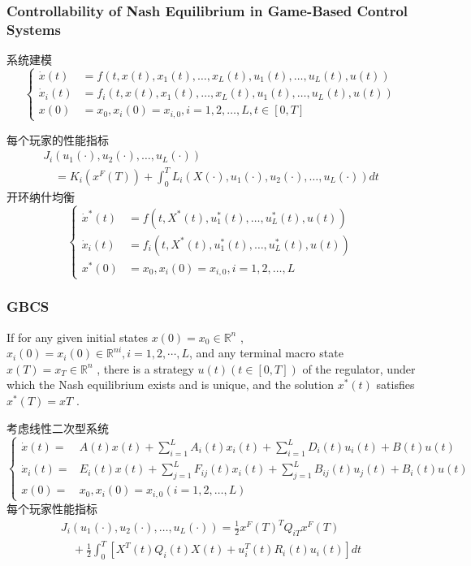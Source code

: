 \documentclass[UTF8, aspectratio=169, 9pt]{ctexbeamer}
\begin{document}
\begin{frame}
\frametitle{Controllability of Nash Equilibrium in Game-Based Control Systems}
系统建模
$$
\left\{\begin{aligned}
\dot{x}(t) &=f\left(t, x(t), x_{1}(t), \ldots, x_{L}(t), u_{1}(t), \ldots, u_{L}(t), u(t)\right) \\
\dot{x}_{i}(t) &=f_{i}\left(t, x(t), x_{1}(t), \ldots, x_{L}(t), u_{1}(t), \ldots, u_{L}(t), u(t)\right) \\
x(0) &=x_{0}, x_{i}(0)=x_{i, 0}, i=1,2, \ldots, L, t \in[0, T]
\end{aligned}\right.
$$

每个玩家的性能指标
$$
\begin{array}{l}
J_{i}\left(u_{1}(\cdot), u_{2}(\cdot), \ldots, u_{L}(\cdot)\right) \\
\quad=K_{i}\left(x^{F}(T)\right)+\int_{0}^{T} L_{i}\left(X(\cdot), u_{1}(\cdot), u_{2}(\cdot), \ldots, u_{L}(\cdot)\right) d t
\end{array}
$$
开环纳什均衡
$$
\left\{\begin{aligned}
\dot{x}^{*}(t) &=f\left(t, X^{*}(t), u_{1}^{*}(t), \ldots, u_{L}^{*}(t), u(t)\right) \\
\dot{x}_{i}(t) &=f_{i}\left(t, X^{*}(t), u_{1}^{*}(t), \ldots, u_{L}^{*}(t), u(t)\right) \\
x^{*}(0) &=x_{0}, x_{i}(0)=x_{i, 0}, i=1,2, \ldots, L
\end{aligned}\right.
$$
\end{frame}

\begin{frame}
\frametitle{GBCS}
\begin{definition}[可控性]
If for any given
initial states $x(0) = x_0 \in  \mathbb{R}^n$ , $x_i (0) = x_i(0) \in  \mathbb{R}^{n i} , i = 1, 2, \cdots , L$,
and any terminal macro state $x(T) = x_T \in  \mathbb{R}^n$ , there is a strategy
$u(t)(t \in [0, T ])$ of the regulator, under which the Nash equilibrium
exists and is unique, and the solution $x^* (t)$ satisfies $x^*(T )
= xT$ .
\end{definition}
考虑线性二次型系统
$$
\left\{\begin{aligned}
\dot{x}(t)=& A(t) x(t)+\sum_{i=1}^{L} A_{i}(t) x_{i}(t)+\sum_{i=1}^{L} D_{i}(t) u_{i}(t) 
+B(t) u(t) \\
\dot{x}_{i}(t)=& E_{i}(t) x(t)+\sum_{j=1}^{L} F_{i j}(t) x_{i}(t)+\sum_{j=1}^{L} B_{i j}(t) u_{j}(t) 
+B_{i}(t) u(t) \\
x(0)=& x_{0}, x_{i}(0)=x_{i, 0}(i=1,2, \ldots, L)
\end{aligned}\right.
$$
每个玩家性能指标
$$
\begin{array}{l}
J_{i}\left(u_{1}(\cdot), u_{2}(\cdot), \ldots, u_{L}(\cdot)\right)=\frac{1}{2} x^{F}(T)^{T} Q_{i T} x^{F}(T) \\
\quad+\frac{1}{2} \int_{0}^{T}\left[X^{T}(t) Q_{i}(t) X(t)+u_{i}^{T}(t) R_{i}(t) u_{i}(t)\right] d t
\end{array}
$$
\end{frame}
\end{document}
